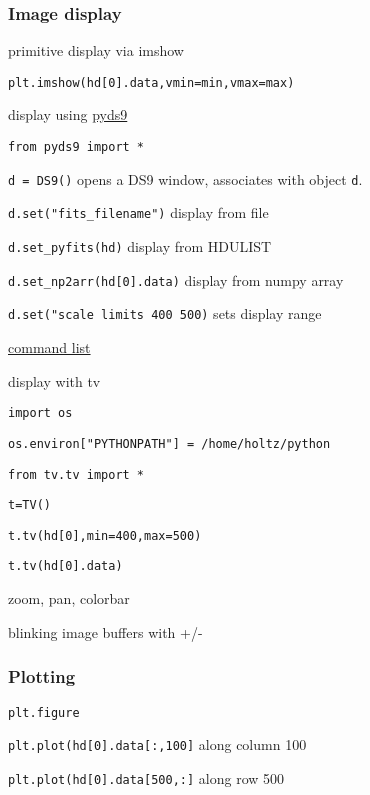 \documentclass{article}
\begin{document}
\subsubsection*{Image display}
\begin{itemize*}
    \item primitive display via imshow
        \begin{itemize*}
            \item \verb|plt.imshow(hd[0].data,vmin=min,vmax=max)|
        \end{itemize*}
    \item display using \href{http://hea-www.harvard.edu/RD/pyds9/}
        {pyds9}
        \begin{itemize*}
            \item \verb|from pyds9 import *|
            \item \verb|d = DS9()| opens a DS9 window, associates with
                object \verb|d|.
            \item \verb|d.set("fits_filename")| display from file
            \item \verb|d.set_pyfits(hd)| display from HDULIST
            \item \verb|d.set_np2arr(hd[0].data)| display from numpy
                array
            \item \verb|d.set("scale limits 400 500)| sets display
                range
            \item \href{http://ds9.si.edu/doc/ref/command.html}
                {command list}
        \end{itemize*}
    \item display with tv
        \begin{itemize*}
            \item \verb|import os|
            \item \verb|os.environ["PYTHONPATH"] = /home/holtz/python|
            \item \verb|from tv.tv import *|
            \item \verb|t=TV()|
            \item \verb|t.tv(hd[0],min=400,max=500)|
            \item \verb|t.tv(hd[0].data)|
            \item zoom, pan, colorbar
            \item blinking image buffers with +/-
        \end{itemize*}
\end{itemize*}
\subsubsection*{Plotting}
\begin{itemize*}
    \item \verb|plt.figure|
    \item \verb|plt.plot(hd[0].data[:,100]| along column 100
    \item \verb|plt.plot(hd[0].data[500,:]| along row 500
\end{itemize*}
\end{document}

